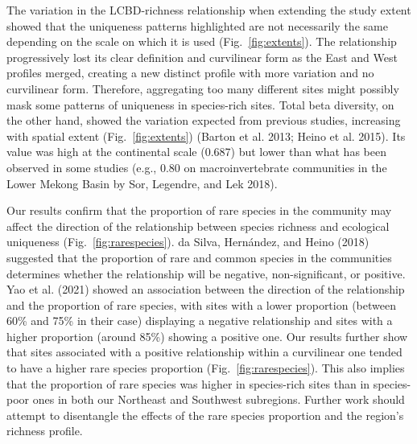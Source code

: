 \documentclass[10pt,oneside]{article}
\begin{document}
The variation in the LCBD-richness relationship when extending the study
extent showed that the uniqueness patterns highlighted are not
necessarily the same depending on the scale on which it is used
(Fig.~\ref{fig:extents}). The relationship progressively lost its clear
definition and curvilinear form as the East and West profiles merged,
creating a new distinct profile with more variation and no curvilinear
form. Therefore, aggregating too many different sites might possibly
mask some patterns of uniqueness in species-rich sites. Total beta
diversity, on the other hand, showed the variation expected from
previous studies, increasing with spatial extent
(Fig.~\ref{fig:extents}) (Barton et al. 2013; Heino et al. 2015). Its
value was high at the continental scale (0.687) but lower than what has
been observed in some studies (e.g., 0.80 on macroinvertebrate
communities in the Lower Mekong Basin by Sor, Legendre, and Lek 2018).

Our results confirm that the proportion of rare species in the community
may affect the direction of the relationship between species richness
and ecological uniqueness (Fig.~\ref{fig:rarespecies}). da Silva,
Hernández, and Heino (2018) suggested that the proportion of rare and
common species in the communities determines whether the relationship
will be negative, non-significant, or positive. Yao et al. (2021) showed
an association between the direction of the relationship and the
proportion of rare species, with sites with a lower proportion (between
60\% and 75\% in their case) displaying a negative relationship and
sites with a higher proportion (around 85\%) showing a positive one. Our
results further show that sites associated with a positive relationship
within a curvilinear one tended to have a higher rare species proportion
(Fig.~\ref{fig:rarespecies}). This also implies that the proportion of
rare species was higher in species-rich sites than in species-poor ones
in both our Northeast and Southwest subregions. Further work should
attempt to disentangle the effects of the rare species proportion and
the region's richness profile.
\end{document}
